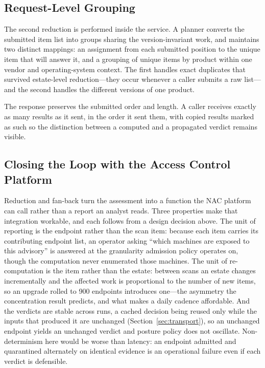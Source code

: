\documentclass[fleqn,10pt,lineno]{wlpeerj}
\begin{document}
\subsection{Request-Level Grouping}
The second reduction is performed inside the service. A planner converts the submitted item list into groups sharing the version-invariant work, and maintains two distinct mappings: an assignment from each submitted position to the unique item that will answer it, and a grouping of unique items by product within one vendor and operating-system context. The first handles exact duplicates that survived estate-level reduction---they occur whenever a caller submits a raw list---and the second handles the different versions of one product.

The response preserves the submitted order and length. A caller receives exactly as many results as it sent, in the order it sent them, with copied results marked as such so the distinction between a computed and a propagated verdict remains visible.

\subsection{Closing the Loop with the Access Control Platform}
Reduction and fan-back turn the assessment into a function the NAC platform can call rather than a report an analyst reads. Three properties make that integration workable, and each follows from a design decision above. The unit of reporting is the endpoint rather than the scan item: because each item carries its contributing endpoint list, an operator asking ``which machines are exposed to this advisory'' is answered at the granularity admission policy operates on, though the computation never enumerated those machines. The unit of re-computation is the item rather than the estate: between scans an estate changes incrementally and the affected work is proportional to the number of new items, so an upgrade rolled to 900 endpoints introduces one---the asymmetry the concentration result predicts, and what makes a daily cadence affordable. And the verdicts are stable across runs, a cached decision being reused only while the inputs that produced it are unchanged (Section~\ref{sec:transport}), so an unchanged endpoint yields an unchanged verdict and posture policy does not oscillate. Non-determinism here would be worse than latency: an endpoint admitted and quarantined alternately on identical evidence is an operational failure even if each verdict is defensible.
\end{document}
